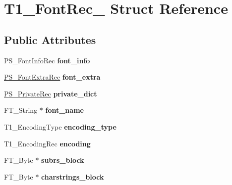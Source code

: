 \hypertarget{struct_t1___font_rec__}{}\section{T1\+\_\+\+Font\+Rec\+\_\+ Struct Reference}
\label{struct_t1___font_rec__}
\subsection*{Public Attributes}
\begin{DoxyCompactItemize}
\item 
\mbox{\label{struct_t1___font_rec___a38098edc6279f539983e0d4694b9949a}} 
P\+S\+\_\+\+Font\+Info\+Rec {\bfseries font\+\_\+info}
\item 
\mbox{\label{struct_t1___font_rec___a8f2f0990ef8ab29e961047b8c2ceca0d}} 
\hyperlink{struct_p_s___font_extra_rec__}{P\+S\+\_\+\+Font\+Extra\+Rec} {\bfseries font\+\_\+extra}
\item 
\mbox{\label{struct_t1___font_rec___a14386570a1b12e477407836e470a258f}} 
\hyperlink{struct_p_s___private_rec__}{P\+S\+\_\+\+Private\+Rec} {\bfseries private\+\_\+dict}
\item 
\mbox{\label{struct_t1___font_rec___a878fc12d0ddda382ffc09c27a7ed81ad}} 
F\+T\+\_\+\+String $\ast$ {\bfseries font\+\_\+name}
\item 
\mbox{\label{struct_t1___font_rec___a20cb798239623daa4ac7fe833a2a9dc9}} 
T1\+\_\+\+Encoding\+Type {\bfseries encoding\+\_\+type}
\item 
\mbox{\label{struct_t1___font_rec___a78de0ca49e25ea59a2736ec5837c77b4}} 
T1\+\_\+\+Encoding\+Rec {\bfseries encoding}
\item 
\mbox{\label{struct_t1___font_rec___a46675e2cba990def15e0ea01b11578a7}} 
F\+T\+\_\+\+Byte $\ast$ {\bfseries subrs\+\_\+block}
\item 
\mbox{\label{struct_t1___font_rec___a8985630587cf6364837fe172391cfadb}} 
F\+T\+\_\+\+Byte $\ast$ {\bfseries charstrings\+\_\+block}

\end{DoxyCompactItemize}
